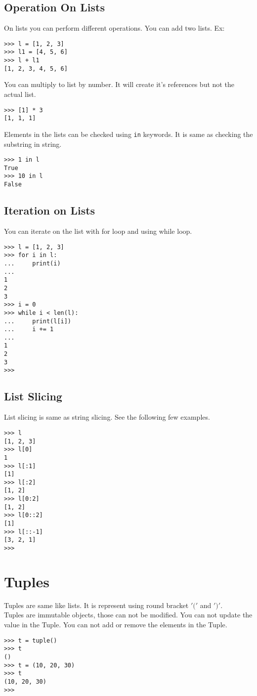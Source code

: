 \documentclass[letterpaper,12pt]{book}
\begin{document}
\subsection{Operation On Lists}
On lists you can perform different operations. You can add two lists. Ex:
\begin{lstlisting}
>>> l = [1, 2, 3]
>>> l1 = [4, 5, 6]
>>> l + l1
[1, 2, 3, 4, 5, 6]
\end{lstlisting}
You can multiply to list by number. It will create it's references but not the actual list.
\begin{lstlisting}
>>> [1] * 3
[1, 1, 1]
\end{lstlisting}
Elements in the lists can be checked using \texttt{in} keywords. It is same as checking the substring in string.
\begin{lstlisting}
>>> 1 in l
True
>>> 10 in l
False
\end{lstlisting}
\subsection{Iteration on Lists}
You can iterate on the list with for loop and using while loop.
\begin{lstlisting}
>>> l = [1, 2, 3]
>>> for i in l:
...     print(i)
... 
1
2
3
>>> i = 0
>>> while i < len(l):
...     print(l[i])
...     i += 1
... 
1
2
3
>>>
\end{lstlisting}
\subsection{List Slicing}
List slicing is same as string slicing. See the following few examples.
\begin{lstlisting}
>>> l
[1, 2, 3]
>>> l[0]
1
>>> l[:1]
[1]
>>> l[:2]
[1, 2]
>>> l[0:2]
[1, 2]
>>> l[0::2]
[1]
>>> l[::-1]
[3, 2, 1]
>>> 
\end{lstlisting}

\section{Tuples}
Tuples are same like lists. It is represent using round bracket $'('$ and $')'$.\\
Tuples are immutable objects, those can not be modified.
You can not update the value in the Tuple.
You can not add or remove the elements in the Tuple.
\begin{lstlisting}
>>> t = tuple()
>>> t
()
>>> t = (10, 20, 30)
>>> t
(10, 20, 30)
>>>
\end{lstlisting}
\end{document}
